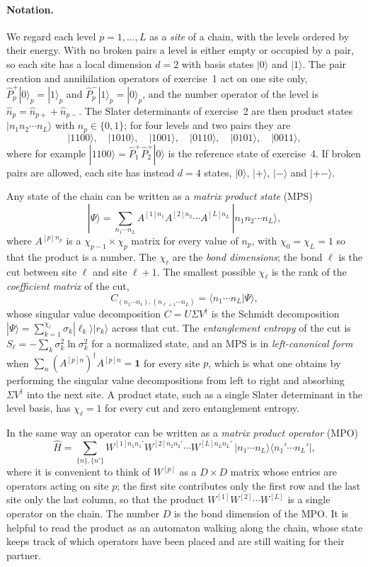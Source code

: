 \documentclass[prc]{revtex4} \usepackage[dvips]{graphicx}
\begin{document}
\paragraph*{Notation.}
We regard each level $p=1,\dots,L$ as a \emph{site} of a chain, with
the levels ordered by their energy. With no broken pairs a level is
either empty or occupied by a pair, so each site has a local
dimension $d=2$ with basis states $|0\rangle$ and $|1\rangle$. The
pair creation and annihilation operators of exercise~1 act on one site
only, $\hat{P}^+_p|0\rangle_p=|1\rangle_p$ and
$\hat{P}^-_p|1\rangle_p=|0\rangle_p$, and the number operator of the
level is $\hat{n}_p=\hat{n}_{p+}+\hat{n}_{p-}$. The Slater
determinants of exercise~2 are then product states
$|n_1n_2\cdots n_L\rangle$ with $n_p\in\{0,1\}$; for four levels and
two pairs they are
\[
|1100\rangle,\quad |1010\rangle,\quad |1001\rangle,\quad
|0110\rangle,\quad |0101\rangle,\quad |0011\rangle,
\]
where for example $|1100\rangle=\hat{P}^+_1\hat{P}^+_2|0\rangle$ is the
reference state of exercise~4. If broken pairs are allowed, each site
has instead $d=4$ states, $|0\rangle$, $|+\rangle$, $|-\rangle$ and
$|+-\rangle$.

Any state of the chain can be written as a \emph{matrix product state}
(MPS)
\[
|\Psi\rangle=\sum_{n_1\cdots n_L}
A^{[1]n_1}A^{[2]n_2}\cdots A^{[L]n_L}\,|n_1n_2\cdots n_L\rangle,
\]
where $A^{[p]n_p}$ is a $\chi_{p-1}\times\chi_p$ matrix for every value
of $n_p$, with $\chi_0=\chi_L=1$ so that the product is a number. The
$\chi_\ell$ are the \emph{bond dimensions}; the bond $\ell$ is the cut
between site $\ell$ and site $\ell+1$. The smallest possible
$\chi_\ell$ is the rank of the \emph{coefficient matrix} of the cut,
\[
C_{(n_1\cdots n_\ell),(n_{\ell+1}\cdots n_L)}
=\langle n_1\cdots n_L|\Psi\rangle ,
\]
whose singular value decomposition $C=U\Sigma V^\dagger$ is the Schmidt
decomposition $|\Psi\rangle=\sum_{k=1}^{\chi_\ell}\sigma_k
|\ell_k\rangle|r_k\rangle$ across that cut. The \emph{entanglement
entropy} of the cut is $S_\ell=-\sum_k\sigma_k^2\ln\sigma_k^2$ for a
normalized state, and an MPS is in \emph{left-canonical form} when
$\sum_{n}(A^{[p]n})^\dagger A^{[p]n}=\mathbf{1}$ for every site $p$,
which is what one obtains by performing the singular value
decompositions from left to right and absorbing $\Sigma V^\dagger$
into the next site. A product state, such as a single Slater
determinant in the level basis, has $\chi_\ell=1$ for every cut and
zero entanglement entropy.

In the same way an operator can be written as a \emph{matrix product
operator} (MPO)
\[
\hat{H}=\sum_{\{n\},\{n'\}} W^{[1]n_1n_1'}W^{[2]n_2n_2'}\cdots
W^{[L]n_Ln_L'}\,|n_1\cdots n_L\rangle\langle n_1'\cdots n_L'| ,
\]
where it is convenient to think of $W^{[p]}$ as a $D\times D$ matrix
whose entries are operators acting on site $p$; the first site
contributes only the first row and the last site only the last column,
so that the product $W^{[1]}W^{[2]}\cdots W^{[L]}$ is a single operator
on the chain. The number $D$ is the bond dimension of the MPO. It is
helpful to read the product as an automaton walking along the chain,
whose state keeps track of which operators have been placed and are
still waiting for their partner.
\end{document}
